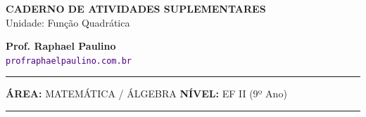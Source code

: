 \documentclass[twoside, 10pt, a4paper]{article}
\begin{document}
\thispagestyle{empty}
\color{Cinzablack}
\vspace*{-1.8cm}

\noindent
\begin{minipage}{\textwidth}
    \selectfont
    \noindent
    \begin{minipage}[t]{0.70\linewidth}
        {\Large \bfseries \MakeUppercase{Caderno de Atividades Suplementares}}\\[0.1cm]
        {\large \textmd{\textcolor{CinzaEscuro}{Unidade: Função Quadrática}}}
    \end{minipage}%
    \begin{minipage}[t]{0.30\linewidth}
        \raggedleft
        \small \textbf{Prof. Raphael Paulino}\\
        \textsf{\small \textcolor{indigo}{\texttt{profraphaelpaulino.com.br}}}
    \end{minipage}
    
    \vspace{0.15cm}
    \noindent\rule{\linewidth}{1.2pt}
    \vspace{-0.1cm}
    \footnotesize\textsf{\textbf{ÁREA:} MATEMÁTICA / ÁLGEBRA \hfill \textbf{NÍVEL:} EF II (9º Ano)}
    \vspace{0.1cm}
    \noindent\rule{\linewidth}{0.4pt}
\end{minipage}
\end{document}
